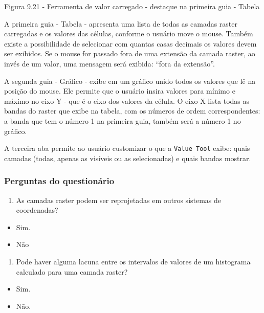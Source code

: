 \documentclass[
  portuguese,
]{krantz}
\providecommand{\tightlist}{%
  \setlength{\itemsep}{0pt}\setlength{\parskip}{0pt}}
\begin{document}
Figura 9.21 - Ferramenta de valor carregado - destaque na primeira guia - Tabela

A primeira guia - Tabela - apresenta uma lista de todas as camadas raster carregadas e os valores das células, conforme o usuário move o mouse. Também existe a possibilidade de selecionar com quantas casas decimais os valores devem ser exibidos. Se o mouse for passado fora de uma extensão da camada raster, ao invés de um valor, uma mensagem será exibida: ``fora da extensão''.

A segunda guia - Gráfico - exibe em um gráfico unido todos os valores que lê na posição do mouse. Ele permite que o usuário insira valores para mínimo e máximo no eixo Y - que é o eixo dos valores da célula. O eixo X lista todas as bandas do raster que exibe na tabela, com os números de ordem correspondentes: a banda que tem o número 1 na primeira guia, também será a número 1 no gráfico.

A terceira aba permite ao usuário customizar o que a \texttt{Value\ Tool} exibe: quais camadas (todas, apenas as visíveis ou as selecionadas) e quais bandas mostrar.

\hypertarget{perguntas-do-questionuxe1rio-15}{%
\subsubsection{\texorpdfstring{\textbf{Perguntas do questionário}}{Perguntas do questionário}}\label{perguntas-do-questionuxe1rio-15}}

\begin{enumerate}
\def\labelenumi{\arabic{enumi}.}
\tightlist
\item
  As camadas raster podem ser reprojetadas em outros sistemas de coordenadas?
\end{enumerate}

\begin{itemize}
\tightlist
\item
  { Sim. }
\item
  Não
\end{itemize}

\begin{enumerate}
\def\labelenumi{\arabic{enumi}.}
\setcounter{enumi}{1}
\tightlist
\item
  Pode haver alguma lacuna entre os intervalos de valores de um histograma calculado para uma camada raster?
\end{enumerate}

\begin{itemize}
\tightlist
\item
  Sim.
\item
  { Não. }
\end{itemize}
\end{document}
